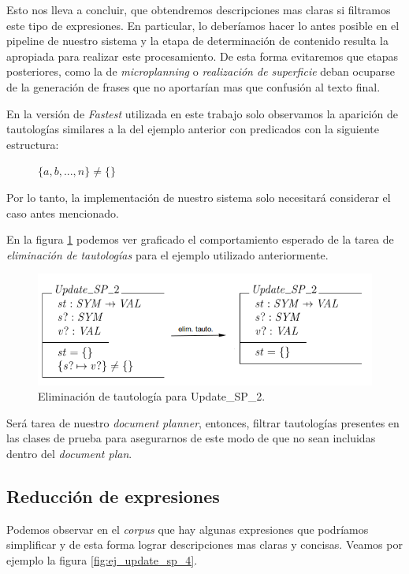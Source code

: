 Esto nos lleva a concluir, que obtendremos descripciones mas claras si filtramos este tipo de expresiones. En particular, lo deberíamos hacer lo antes posible en el pipeline de nuestro sistema y la etapa de determinación de contenido resulta la apropiada para realizar este procesamiento. De esta forma evitaremos que etapas posteriores, como la de \emph{microplanning} o \emph{realización de superficie} deban ocuparse de la generación de frases que no aportarían mas que confusión al texto final.

En la versión de \emph{Fastest} utilizada en este trabajo solo observamos la aparición de tautologías similares a la del ejemplo anterior con predicados con la siguiente estructura:

\begin{figure}[H]
  \centering
  $\{ a, b, ... , n \} \neq \{ \}$ 
\end{figure}


Por lo tanto, la implementación de nuestro sistema solo necesitará considerar el caso antes mencionado. 

En la figura \ref{fig:ej_elim_tauto} podemos ver graficado el comportamiento esperado de la tarea de \emph{eliminación de tautologías} para el ejemplo utilizado anteriormente.

\begin{figure}[H]
  	\centering
	\includegraphics[scale=0.4]{img/ej_elim_tauto.png}
	\caption{Eliminación de tautología para Update\_SP\_2.}
  	\label{fig:ej_elim_tauto}
\end{figure}

Será tarea de nuestro \textit{document planner}, entonces, filtrar tautologías presentes en las clases de prueba para asegurarnos de este modo de que no sean  incluidas dentro del \emph{document plan}.

\subsection*{Reducción de expresiones}
Podemos observar en el \emph{corpus} que hay algunas expresiones que podríamos simplificar y de esta forma lograr descripciones mas claras y concisas. Veamos por ejemplo la figura \ref{fig:ej_update_sp_4}.

